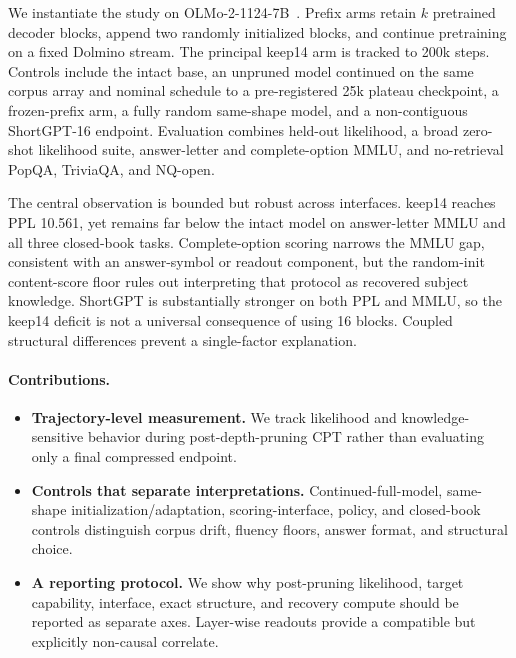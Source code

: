 We instantiate the study on OLMo-2-1124-7B~\citep{olmo2}. Prefix arms retain
$k$ pretrained decoder blocks, append two randomly initialized blocks, and
continue pretraining on a fixed Dolmino stream. The principal keep14 arm is
tracked to 200k steps. Controls include the intact base, an unpruned model
continued on the same corpus array and nominal schedule to a pre-registered
25k plateau checkpoint, a
frozen-prefix arm, a fully random same-shape model, and a non-contiguous
ShortGPT-16 endpoint. Evaluation combines held-out likelihood, a broad zero-shot
likelihood suite, answer-letter and complete-option MMLU, and no-retrieval
PopQA, TriviaQA, and NQ-open.

The central observation is bounded but robust across interfaces. keep14 reaches
PPL 10.561, yet remains far below the intact model on answer-letter MMLU and
all three closed-book tasks. Complete-option scoring narrows the MMLU gap,
consistent with an answer-symbol or readout component, but the random-init
content-score floor rules out interpreting that protocol as recovered subject
knowledge. ShortGPT is substantially stronger on both PPL and MMLU, so the
keep14 deficit is not a universal consequence of using 16 blocks. Coupled
structural differences prevent a single-factor explanation.

\paragraph{Contributions.}
\begin{itemize}[leftmargin=1.2em,itemsep=2pt]
\item \textbf{Trajectory-level measurement.} We track likelihood and
knowledge-sensitive behavior during post-depth-pruning CPT rather than
evaluating only a final compressed endpoint.
\item \textbf{Controls that separate interpretations.} Continued-full-model,
same-shape initialization/adaptation, scoring-interface, policy, and
closed-book controls distinguish corpus drift, fluency floors, answer format,
and structural choice.
\item \textbf{A reporting protocol.} We show why post-pruning likelihood,
target capability, interface, exact structure, and recovery compute should be
reported as separate axes. Layer-wise readouts provide a compatible but
explicitly non-causal correlate.
\end{itemize}
